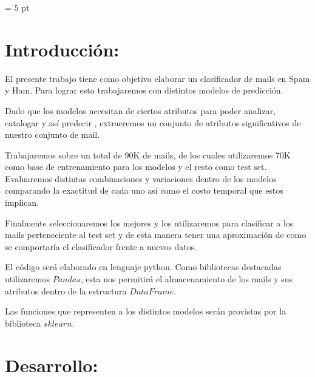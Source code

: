 \documentclass[a4paper]{article}
\begin{document}
\parskip = 5 pt
\thispagestyle{empty}

\maketitle




\newpage
\tableofcontents
\thispagestyle{empty}

\newpage
\section{Introducción:}

El presente trabajo tiene como objetivo elaborar un clasificador de mails en Spam y Ham. Para lograr esto trabajaremos con distintos modelos de predicción. 


Dado que los modelos necesitan de ciertos atributos para poder analizar, catalogar y así predecir , extraeremos un conjunto de atributos significativos de nuestro conjunto de mail.


Trabajaremos sobre un total de 90K de mails, de los cuales utilizaremos 70K como base de entrenamiento para los modelos y el resto como test set. 
 Evaluaremos distintas combinaciones y variaciones dentro de los modelos comparando la exactitud de cada uno así como el costo temporal que estos implican. 
 
 Finalmente seleccionaremos los mejores y los utilizaremos para clasificar a los mails perteneciente al test set y de esta manera tener una aproximación de como se comportaría el clasificador frente a nuevos datos.  
 
 
El código será elaborado en lenguaje python. Como bibliotecas destacadas utilizaremos $Pandas$, esta nos permitirá el almacenamiento de los mails y sus atributos dentro de la estructura $DataFrame$.

Las funciones que representen a los distintos modelos serán provistas por la biblioteca $sklearn$.



\newpage

\section{Desarrollo:}
\end{document}
